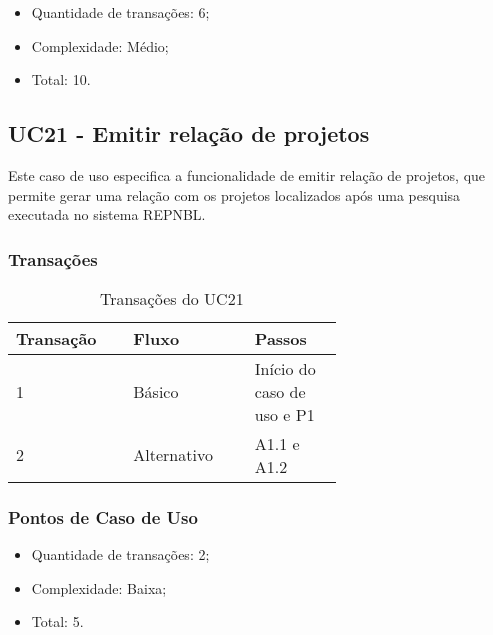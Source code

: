   \begin{itemize}
  \item Quantidade de transações: 6;
  \item Complexidade: Médio;
  \item Total: 10.
  \end{itemize}

\vfill
\pagebreak
\subsection{UC21 - Emitir relação de projetos}
  
  Este caso de uso especifica a funcionalidade de emitir relação de projetos, que permite gerar uma relação com
  os projetos localizados após uma pesquisa executada no sistema REPNBL.
  
  \subsubsection{Transações}

  \begin{table*}[!h]
  \centering
  \caption{Transações do UC21}
  \label{uc21_transactions}
    \begin{tabular}{|p{0.20\linewidth}|p{0.25\linewidth}|p{0.20\linewidth}|}
    \hline
    \textbf{Transação} & \textbf{Fluxo} & \textbf{Passos} \\ 
    \hline
    1 & Básico & Início do caso de uso e P1\\
    \hline
    2 & Alternativo & A1.1 e A1.2 \\
    \hline
    \end{tabular}
  \end{table*}

  \subsubsection{Pontos de Caso de Uso}

  \begin{itemize}
  \item Quantidade de transações: 2;
  \item Complexidade: Baixa;
  \item Total: 5.
  \end{itemize}

  \vfill